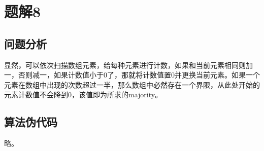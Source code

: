 \section{题解8}
\subsection{问题分析}
显然，可以依次扫描数组元素，给每种元素进行计数，如果和当前元素相同则加一，否则减一，如果计数值小于0了，那就将计数值置0并更换当前元素。如果一个元素在数组中出现的次数超过一半，那么数组中必然存在一个界限，从此处开始的元素计数值不会降到0，该值即为所求的majority。

\subsection{算法伪代码}
略。